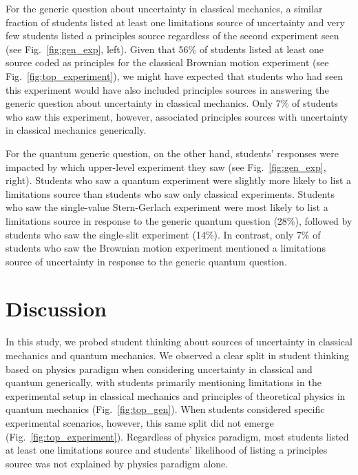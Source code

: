 \documentclass[english,aps,prstper,reprint,showpacs,longbibliography,superscriptaddress,nofootinbib]{revtex4-2}
\begin{document}
For the generic question about uncertainty in classical mechanics, %
a similar fraction of students listed at least one limitations source of uncertainty and very few students listed a principles source regardless of the second experiment seen (see Fig.~\ref{fig:gen_exp}, left). Given that 56\% of students listed at least one source coded as principles for the classical Brownian motion experiment (see Fig.~\ref{fig:top_experiment}), we might have expected that students who had seen this experiment would have also included principles sources in answering the generic question about uncertainty in classical mechanics. Only 7\% of students who saw this experiment, however, associated principles sources with uncertainty in classical mechanics generically.

For the quantum generic question, on the other hand, students' responses were impacted by which upper-level experiment they saw (see Fig.~\ref{fig:gen_exp}, right). %
Students who saw a quantum experiment were slightly more likely to list a limitations source than students who saw only classical experiments. Students who saw the single-value Stern-Gerlach experiment were most likely to list a limitations source in response to the generic quantum question (28\%), followed by students who saw the single-slit experiment (14\%). In contrast, only 7\% of students who saw the Brownian motion experiment mentioned a limitations source of uncertainty in response to the generic quantum question.

\section{Discussion}

In this study, we probed student thinking about sources of uncertainty in classical mechanics and quantum mechanics. We observed a clear split in student thinking based on physics paradigm when considering uncertainty in classical and quantum generically, with students primarily mentioning limitations in the experimental setup in classical mechanics and principles of theoretical physics in quantum mechanics (Fig.~\ref{fig:top_gen}). When students considered specific experimental scenarios, however, this same split did not emerge (Fig.~\ref{fig:top_experiment}). Regardless of physics paradigm, most students listed at least one limitations source and students' likelihood of listing a principles source was not explained by physics paradigm alone.
\end{document}
